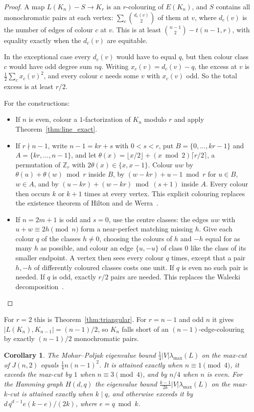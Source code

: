 \documentclass{article}
\newtheorem{corollary}[theorem]{Corollary}
\theoremstyle{definition}
\begin{document}
\begin{proof}
A map $L(K_n)-S\to K_r$ is an $r$-colouring of $E(K_n)$, and $S$ contains all
monochromatic pairs at each vertex: $\sum_c\binom{d_c(v)}2$ of them at $v$, where
$d_c(v)$ is the number of edges of colour $c$ at $v$.  This is at least
$\binom{n-1}2-t(n-1,r)$, with equality exactly when the $d_c(v)$ are
equitable.

In the exceptional case every $d_c(v)$ would have to equal $q$, but then colour
class $c$ would have odd degree sum $nq$.  Writing $x_c(v)=d_c(v)-q$, the excess at
$v$ is $\frac12\sum_cx_c(v)^2$, and every colour $c$ needs some $v$ with
$x_c(v)$ odd.  So the total excess is at least $r/2$.

For the constructions:
\begin{itemize}
\item If $n$ is even, colour a $1$-factorization of $K_n$ modulo $r$ and apply
Theorem~\ref{thm:line_exact}.
\item If $r\nmid n-1$, write $n-1=kr+s$ with $0<s<r$, put $B=\{0,\dots,kr-1\}$ and
$A=\{kr,\dots,n-1\}$, and let $\theta(x)=\lfloor x/2\rfloor+(x\bmod2)\lceil r/2\rceil$,
a permutation of $\mathbb Z_r$ with $2\theta(x)\in\{x,x-1\}$.  Colour $uw$ by
$\theta(u)+\theta(w)\bmod r$ inside $B$, by $(w-kr)+u-1\bmod r$ for $u\in B$,
$w\in A$, and by $(u-kr)+(w-kr)\bmod(s+1)$ inside $A$.  Every colour then occurs
$k$ or $k+1$ times at every vertex.  This explicit colouring replaces the
existence theorem of Hilton and de Werra~\cite{hiltondewerra1994}.
\item If $n=2m+1$ is odd and $s=0$, use the centre classes: the edges $uw$ with
$u+w\equiv2h\pmod n$ form a near-perfect matching missing $h$.  Give each colour
$q$ of the classes $h\ne0$, choosing the colours of $h$ and $-h$ equal for as
many $h$ as possible, and colour an edge $\{u,-u\}$ of class $0$ like the class
of its smaller endpoint.  A vertex then sees every colour $q$ times, except
that a pair $h,-h$ of differently coloured classes costs one unit.  If $q$ is
even no such pair is needed.  If $q$ is odd, exactly $r/2$ pairs are needed.
This replaces the Walecki decomposition~\cite{lucas1892}.
\end{itemize}
\end{proof}

For $r=2$ this is Theorem~\ref{thm:triangular}.  For $r=n-1$ and odd $n$ it gives
$|L(K_n),K_{n-1}|=(n-1)/2$, so $K_n$ falls short of an $(n-1)$-edge-colouring by
exactly $(n-1)/2$ monochromatic pairs.

\begin{corollary}
\label{cor:spectral}
The Mohar--Poljak eigenvalue bound $\frac14|V|\lambda_{\max}(L)$ on the max-cut
of $J(n,2)$ equals $\frac14n(n-1)^2$.  It is attained exactly when
$n\equiv1\pmod4$, it exceeds the max-cut by $1$ when $n\equiv3\pmod4$, and by
$n/4$ when $n$ is even.  For the Hamming graph $H(d,q)$ the eigenvalue bound
$\frac{k-1}{2k}|V|\lambda_{\max}(L)$ on the max-$k$-cut is attained exactly when
$k\mid q$, and otherwise exceeds it by $d\,q^{d-1}e(k-e)/(2k)$, where
$e=q\bmod k$.
\end{corollary}
\end{document}
